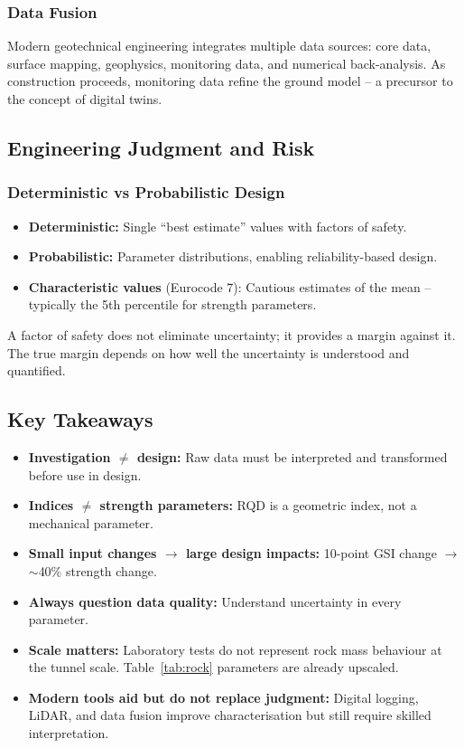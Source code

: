 \documentclass[a4paper,12pt]{article}
\begin{document}
\subsubsection{Data Fusion}
Modern geotechnical engineering integrates multiple data sources: core data, surface mapping, geophysics, monitoring data, and numerical back-analysis. As construction proceeds, monitoring data refine the ground model -- a precursor to the concept of digital twins.

\subsection{Engineering Judgment and Risk}

\subsubsection{Deterministic vs Probabilistic Design}
\begin{itemize}
    \item \textbf{Deterministic:} Single ``best estimate'' values with factors of safety.
    \item \textbf{Probabilistic:} Parameter distributions, enabling reliability-based design.
    \item \textbf{Characteristic values} (Eurocode 7): Cautious estimates of the mean -- typically the 5th percentile for strength parameters.
\end{itemize}

\begin{notebox}
A factor of safety does not eliminate uncertainty; it provides a margin against it. The true margin depends on how well the uncertainty is understood and quantified.
\end{notebox}

\subsection{Key Takeaways}
\begin{itemize}
    \item \textbf{Investigation $\neq$ design:} Raw data must be interpreted and transformed before use in design.
    \item \textbf{Indices $\neq$ strength parameters:} RQD is a geometric index, not a mechanical parameter.
    \item \textbf{Small input changes $\to$ large design impacts:} 10-point GSI change $\to$ $\sim$40\% strength change.
    \item \textbf{Always question data quality:} Understand uncertainty in every parameter.
    \item \textbf{Scale matters:} Laboratory tests do not represent rock mass behaviour at the tunnel scale. Table~\ref{tab:rock} parameters are already upscaled.
    \item \textbf{Modern tools aid but do not replace judgment:} Digital logging, LiDAR, and data fusion improve characterisation but still require skilled interpretation.
\end{itemize}
\end{document}
